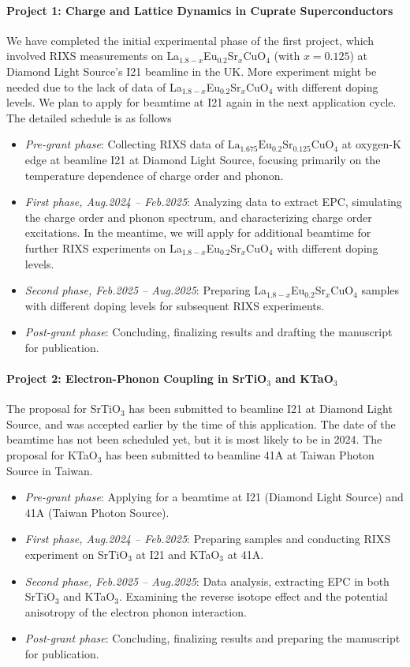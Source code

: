 \documentclass[11pt]{article}
\begin{document}
\paragraph{Project 1: Charge and Lattice Dynamics in Cuprate Superconductors}
We have completed the initial experimental phase of the first project, which involved RIXS measurements on {La$_{1.8-x}$Eu$_{0.2}$Sr$_x$CuO$_{4}$} (with $x=0.125$) at Diamond Light Source's I21 beamline in the UK. More experiment might be needed due to the lack of data of {La$_{1.8-x}$Eu$_{0.2}$Sr$_x$CuO$_{4}$} with different doping levels. We plan to apply for beamtime at I21 again in the next application cycle. The detailed schedule is as follows
\begin{itemize}
  \item \textit{Pre-grant phase}: Collecting RIXS data of $\mathrm{La_{1.675}Eu_{0.2}Sr_{0.125}CuO_{4}}$ at oxygen-K edge at beamline I21 at Diamond Light Source, focusing primarily on the temperature dependence of charge order and phonon. 
  \item \textit{First phase, Aug.2024 -- Feb.2025}: Analyzing data to extract EPC, simulating the charge order and phonon spectrum, and characterizing charge order excitations. In the meantime, we will apply for additional beamtime for further RIXS experiments on {La$_{1.8-x}$Eu$_{0.2}$Sr$_x$CuO$_{4}$} with different doping levels. 
  \item \textit{Second phase, Feb.2025 -- Aug.2025}: Preparing {La$_{1.8-x}$Eu$_{0.2}$Sr$_x$CuO$_{4}$} samples with different doping levels for subsequent RIXS experiments. 
  \item \textit{Post-grant phase}: Concluding,  finalizing results and drafting the manuscript for publication.
\end{itemize}

\paragraph{Project 2: Electron-Phonon Coupling in SrTiO$_{3}$ and KTaO$_{3}$}
The proposal for SrTiO$_{3}$ has been submitted to beamline I21 at Diamond Light Source, and was accepted earlier by the time of this application. The date of the beamtime has not been scheduled yet, but it is most likely to be in 2024. The proposal for KTaO$_{3}$ has been submitted to beamline 41A at Taiwan Photon Source in Taiwan. 
\begin{itemize}
  \item \textit{Pre-grant phase}: Applying for a beamtime at I21 (Diamond Light Source) and 41A (Taiwan Photon Source).
  \item \textit{First phase, Aug.2024 -- Feb.2025}: Preparing samples and conducting RIXS experiment on SrTiO$_{3}$ at I21 and KTaO$_{3}$ at 41A. 
  \item \textit{Second phase, Feb.2025 -- Aug.2025}: Data analysis, extracting EPC in both SrTiO$_{3}$ and KTaO$_{3}$. Examining the reverse isotope effect and the potential anisotropy of the electron phonon interaction.
  \item \textit{Post-grant phase}:  Concluding,  finalizing results and preparing the manuscript for publication.
\end{itemize}
\end{document}
